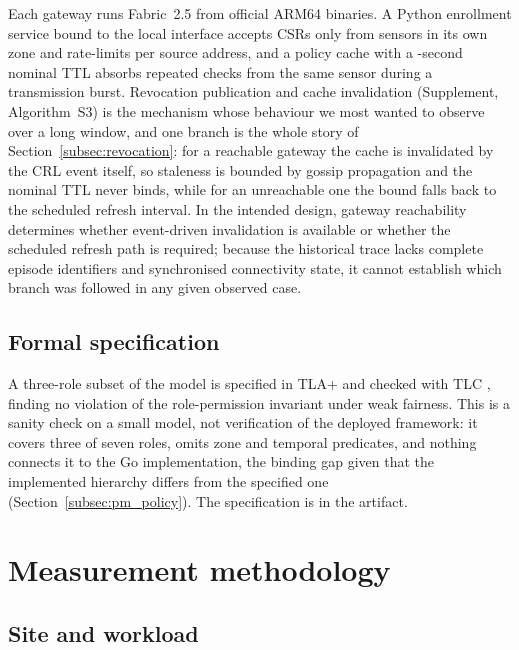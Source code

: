\documentclass[a4paper,fleqn]{cas-sc}
\begin{document}
Each gateway runs Fabric~2.5 from official ARM64 binaries. A Python
enrollment service bound to the local interface accepts CSRs only from
sensors in its own zone and rate-limits per source address, and a policy
cache with a \RevCacheTTL-second nominal TTL absorbs repeated checks from
the same sensor during a transmission burst. Revocation publication and
cache invalidation (Supplement, Algorithm~S3) is the mechanism whose
behaviour we most wanted to observe over a long window, and one branch is
the whole story of Section~\ref{subsec:revocation}: for a reachable
gateway the cache is invalidated by the CRL event itself, so staleness is
bounded by gossip propagation and the nominal TTL never binds, while for an
unreachable one the bound falls back to the scheduled refresh interval.
In the intended design, gateway reachability determines whether
event-driven invalidation is available or whether the scheduled refresh
path is required; because the historical trace lacks complete episode
identifiers and synchronised connectivity state, it cannot establish
which branch was followed in any given observed case.

\subsection{Formal specification}
\label{subsec:tla}

A three-role subset of the model is specified in TLA+ and checked with TLC
\cite{lamport2002specifying,newcombe2015amazon}, finding no violation of
the role-permission invariant under weak fairness. This is a sanity check
on a small model, not verification of the deployed framework: it covers
three of seven roles, omits zone and temporal predicates, and nothing
connects it to the Go implementation, the binding gap given that the
implemented hierarchy differs from the specified one
(Section~\ref{subsec:pm_policy}). The specification is in the artifact.

\FloatBarrier
\section{Measurement methodology}
\label{sec:method}

\subsection{Site and workload}
\label{subsec:deployment}
\end{document}
